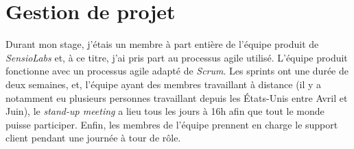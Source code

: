\chapter{Gestion de projet}
 
Durant mon stage, j'étais un membre à part entière de l'équipe produit de \emph{SensioLabs} et, à ce titre, j'ai pris part au processus agile utilisé. L'équipe produit fonctionne avec un processus agile adapté de \emph{Scrum}. Les sprints ont une durée de deux semaines, et, l'équipe ayant des membres travaillant à distance (il y a notamment eu plusieurs personnes travaillant depuis les États-Unis entre Avril et Juin), le \emph{stand-up meeting} a lieu tous les jours à 16h afin que tout le monde puisse participer. Enfin, les membres de l'équipe prennent en charge le support client pendant une journée à tour de rôle.

